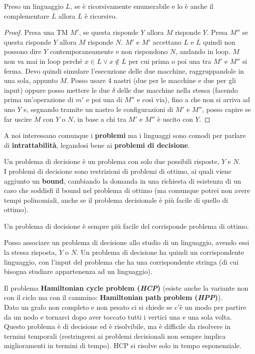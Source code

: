 \documentclass[a4paper,12pt, oneside]{book}
\begin{document}
\begin{teorema}
  Preso un linguaggio $L$, se è ricorsivamente enumerabile e lo è anche il
  complementare $\overline{L}$ allora $L$ è ricorsivo.
\end{teorema}
\begin{proof}
  Presa una TM $M'$, se questa risponde $Y$ allora $M$ risponde $Y$. Presa $M''$
  se questa risponde $Y$ allora $M$ risponde $N$. $M'$ e $M'$ accettano $L$ e
  $\overline{L}$ quindi non possono dire $Y$ contemporaneamente e non rispondono
  $N$, andando in loop. $M$ non va mai in loop perché $x\in L\lor x\not\in L$
  per cui prima o poi una tra $M'$ e $M''$ si ferma. Devo quindi simulare
  l'esecuzione delle due macchine, raggruppandole in una sola, appunto
  $M$. Posso usare 4 nastri (due per le macchine e due per gli input) oppure
  posso mettere le due $\delta$ delle due macchine nella stessa (facendo prima
  un'operazione di $m'$ e poi una di $M''$ e così via), fino a che non si arriva
  ad uno $Y$ e, segnando tramite un nastro le configurazioni di $M'$ e $M''$,
  posso capire se far uscire $M$ con $Y$ o $N$, in base a chi tra $M'$ e $M''$ è
  uscito con $Y$. 
\end{proof}
A noi interessano comunque i \textbf{problemi} ma i linguaggi sono comodi per
parlare di \textbf{intrattabilità}, legandosi bene ai \textbf{problemi di
  decisione}.
\begin{definizione}
  Un problema di decisione è un problema con solo due possibili risposte, $Y$ e
  $N$.\\
  I problemi di decisione sono restrizioni di problemi di ottimo, ai quali viene
  aggiunto un \textbf{bound}, cambiando la domanda in una richiesta di esistenza
  di un caso che soddisfi il bound nel problema di ottimo (ma comunque potrei
  non avere tempi polinomiali, anche se il problema decisionale è più facile di
  quello di ottimo).
\end{definizione}
\begin{teorema}
  Un problema di decisione è sempre più facile del corrisponde problema di
  ottimo.
\end{teorema}
Posso associare un problema di decisione allo studio di un linguaggio, avendo
essi la stessa risposta, $Y$ o $N$. Un problema di decisione ha quindi un
corrispondente linguaggio, con l'input del problema che ha una corrispondente
stringa (di cui bisogna studiare appartenenza ad un linguaggio).\\
\begin{esempio}
  Il problema \textbf{Hamiltonian cycle problem (\textit{HCP})} (esiste anche la
  variante non con il ciclo ma con il cammino: \textbf{Hamiltonian path problem
    (\textit{HPP})}).\\ 
  Dato un grafo non completo e non pesato ci si chiede se c'è un modo per
  partire da un nodo e tornarci dopo aver toccato tutti i vertici una e una sola
  volta.\\
  Questo problema è di decisione ed è risolvibile, ma è difficile da risolvere
  in termini temporali (restringersi ai problemi decisionali non sempre implica
  miglioramenti in termini di tempo). HCP si risolve solo in tempo esponenziale.
\end{esempio}
\end{document}

